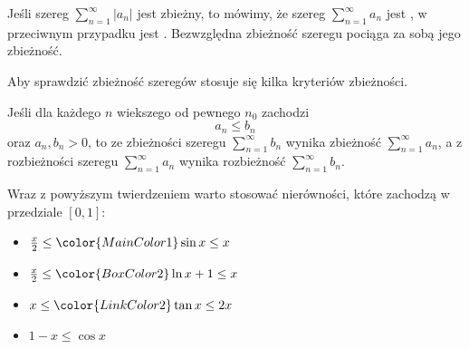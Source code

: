 Jeśli szereg $\sum_{n=1}^\infty |a_n|$ jest zbieżny, to mówimy, że szereg $\sum_{n=1}^\infty a_n$ jest , w przeciwnym przypadku jest . Bezwzględna zbieżność szeregu pociąga za sobą jego zbieżność.

Aby sprawdzić zbieżność szeregów stosuje się kilka kryteriów zbieżności.

\begin{theorem}
    Jeśli dla każdego $n$ wiekszego od pewnego $n_0$ zachodzi
    \[ a_n \leq b_n \]
    oraz $a_n, b_n > 0$, to ze zbieżności szeregu $\sum_{n=1}^\infty b_n$ wynika zbieżność $\sum_{n=1}^\infty a_n$, a z rozbieżności szeregu $\sum_{n=1}^\infty a_n$ wynika rozbieżność $\sum_{n=1}^\infty b_n$.
\end{theorem}

\begin{remark*}
    \begin{multicols}{2}
    Wraz z powyższym twierdzeniem warto stosować nierówności, które zachodzą w przedziale $[0,1]$:
    \begin{itemize}
        \item $\frac{x}{2} \leq {\color{MainColor1} \sin{x}} \leq x$
        \item $\frac{x}{2} \leq {\color{BoxColor2} \ln{x + 1}} \leq x$
        \item $x \leq {\color{LinkColor2} \tan{x}} \leq 2x$
        \item $1 - x \leq \cos{x}$
    \end{itemize}
    \hspace{2em}

    \end{multicols}
\end{remark*}

